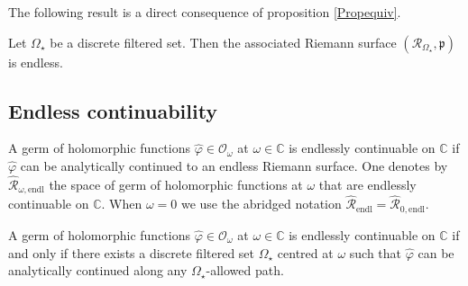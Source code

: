 \documentclass[11pt, english]{smfart}
\theoremstyle{definition}
\begin{document}
The following result is a direct 
consequence of proposition \ref{Propequiv}.

\begin{prop}
Let $\Omega_\star$ be a discrete filtered set. Then the associated
Riemann surface $(\mathscr{R}_{\Omega_\star}, \mathfrak{p})$ is endless.
\end{prop}

\subsection{Endless continuability}

\begin{defi}\label{defendlesscont}
A germ of holomorphic functions ${ \widehat{\varphi} \in \mathcal{O}_\omega}$ at $\omega
\in \mathbb{C}$ is 
endlessly continuable on $\mathbb{C}$ if $\widehat{\varphi}$ can be
analytically continued to an endless Riemann surface. One denotes by
$\hat{\mathscr{R}}_{\omega, \mathrm{endl}}$  the space of germ of
holomorphic functions at $\omega$ that are endlessly continuable on
$\mathbb{C}$. When $\omega=0$ we use the abridged notation 
$\hat{\mathscr{R}}_{\mathrm{endl}} = \hat{\mathscr{R}}_{0, \mathrm{endl}}$.
\end{defi}

\begin{prop}
A germ of holomorphic functions $\widehat{\varphi} \in \mathcal{O}_\omega$
at $\omega \in \mathbb{C}$ is endlessly continuable on $\mathbb{C}$ if
and only if  there exists a discrete filtered set
$\Omega_\star$ centred at $\omega$
such that $\widehat{\varphi}$ can be analytically continued along any
$\Omega_\star$-allowed path. 
\end{prop}
\end{document}
